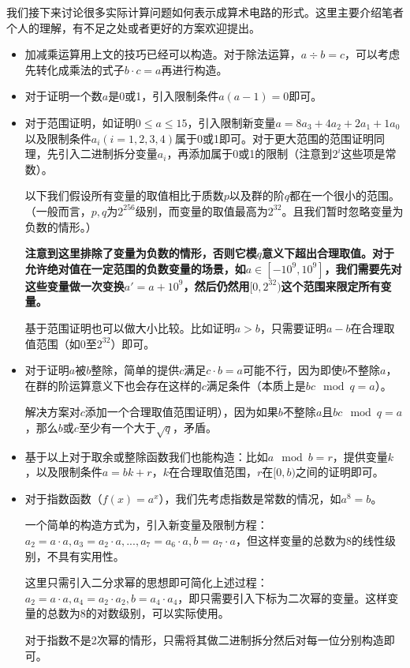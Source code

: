 \documentclass[12pt]{article}
\begin{document}
我们接下来讨论很多实际计算问题如何表示成算术电路的形式。这里主要介绍笔者个人的理解，有不足之处或者更好的方案欢迎提出。
\begin{itemize}
	\item 加减乘运算用上文的技巧已经可以构造。对于除法运算，$a \div b=c$，可以考虑先转化成乘法的式子$b \cdot c=a$再进行构造。
	\item 对于证明一个数$a$是0或1，引入限制条件$a(a-1)=0$即可。
	\item 对于范围证明，如证明$0 \leq a \leq 15$，引入限制新变量$a=8a_3+4a_2+2a_1+1a_0$以及限制条件$a_i(i=1,2,3,4)$属于0或1即可。对于更大范围的范围证明同理，先引入二进制拆分变量$a_i$，再添加属于0或1的限制（注意到$2^i$这些项是常数）。
	
	以下我们假设所有变量的取值相比于质数$p$以及群的阶$q$都在一个很小的范围。（一般而言，$p,q$为$2^{256}$级别，而变量的取值最高为$2^{32}$。且我们暂时忽略变量为负数的情形。）
	
	 \textbf{注意到这里排除了变量为负数的情形，否则它模$q$意义下超出合理取值。对于允许绝对值在一定范围的负数变量的场景，如$a\in [-10^9,10^9]$，我们需要先对这些变量做一次变换$a'=a+10^9$，然后仍然用$[0,2^{32})$这个范围来限定所有变量。}
	
	基于范围证明也可以做大小比较。比如证明$a>b$，只需要证明$a-b$在合理取值范围（如0至$2^{32}$）即可。
	
	\item 对于证明$a$被$b$整除，简单的提供$c$满足$c\cdot b=a$可能不行，因为即使$b$不整除$a$，在群的阶运算意义下也会存在这样的$c$满足条件（本质上是$bc \mod q=a$）。
	
	解决方案对$c$添加一个合理取值范围证明），因为如果$b$不整除$a$且$bc \mod q =a$，那么$b$或$c$至少有一个大于$\sqrt{q}$，矛盾。
	\item 基于以上对于取余或整除函数我们也能构造：比如$a \mod b =r$，提供变量$k$，以及限制条件$a=bk+r$，$k$在合理取值范围，$r$在$[0,b)$之间的证明即可。
	\item 对于指数函数（$f(x)=a^x$），我们先考虑指数是常数的情况，如$a^8=b$。
	
	一个简单的构造方式为，引入新变量及限制方程：$a_2=a\cdot a,a_3=a_2\cdot a,...,a_7=a_6\cdot a,b=a_7\cdot a$，但这样变量的总数为$8$的线性级别，不具有实用性。
	
	这里只需引入二分求幂的思想即可简化上述过程：$a_2=a\cdot a, a_4=a_2\cdot a_2,b=a_4\cdot a_4$，即只需要引入下标为二次幂的变量。这样变量的总数为$8$的对数级别，可以实际使用。
	
	对于指数不是2次幂的情形，只需将其做二进制拆分然后对每一位分别构造即可。
	

\end{itemize}
\end{document}
